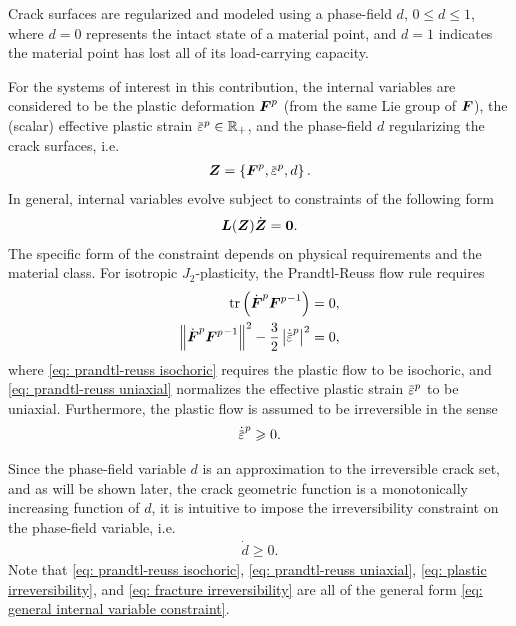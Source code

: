 Crack surfaces are regularized and modeled using a phase-field $d$, $0 \leqslant d \leqslant 1$, where $d = 0$ represents the intact state of a material point, and $d = 1$ indicates the material point has lost all of its load-carrying capacity.

For the systems of interest in this contribution, the internal variables are considered to be the plastic deformation $\boldsymbol{F}^p$ (from the same Lie group of $\boldsymbol{F}$), the (scalar) effective plastic strain $\ep \in \mathbb{R}_+$, and the phase-field $d$ regularizing the crack surfaces, i.e.
\begin{align}
  \bfZ = \left\{ \bfF^p, \ep, d \right\}.
\end{align}
In general, internal variables evolve subject to constraints of the following form
\begin{align}
  \boldsymbol{L}(\boldsymbol{Z})\dot{\boldsymbol{Z}} = \boldsymbol{0}. \label{eq: general internal variable constraint}
\end{align}
The specific form of the constraint depends on physical requirements and the material class. For isotropic $J_2$-plasticity, the Prandtl-Reuss flow rule requires
\begin{subequations}
  \begin{align}
    \tr\left( \dot{\bfF}^p {\bfF^p}^{-1} \right)                     & = 0, \label{eq: prandtl-reuss isochoric} \\
    \norm{\dot{\bfF}^p {\bfF^p}^{-1}}^2 - \dfrac{3}{2}\abs{\epdot}^2 & = 0, \label{eq: prandtl-reuss uniaxial}  
  \end{align}
\end{subequations}
where \eqref{eq: prandtl-reuss isochoric} requires the plastic flow to be isochoric, and \eqref{eq: prandtl-reuss uniaxial} normalizes the effective plastic strain $\ep$ to be uniaxial. Furthermore, the plastic flow is assumed to be irreversible in the sense
\begin{align}
  \epdot \geqslant 0. \label{eq: plastic irreversibility}
\end{align}

Since the phase-field variable $d$ is an approximation to the irreversible crack set, and as will be shown later, the crack geometric function is a monotonically increasing function of $d$, it is intuitive to impose the irreversibility constraint on the phase-field variable, i.e.
\begin{align}
  \dot{d} \geqslant 0. \label{eq: fracture irreversibility}
\end{align}
Note that \eqref{eq: prandtl-reuss isochoric}, \eqref{eq: prandtl-reuss uniaxial}, \eqref{eq: plastic irreversibility}, and \eqref{eq: fracture irreversibility} are all of the general form \eqref{eq: general internal variable constraint}.
